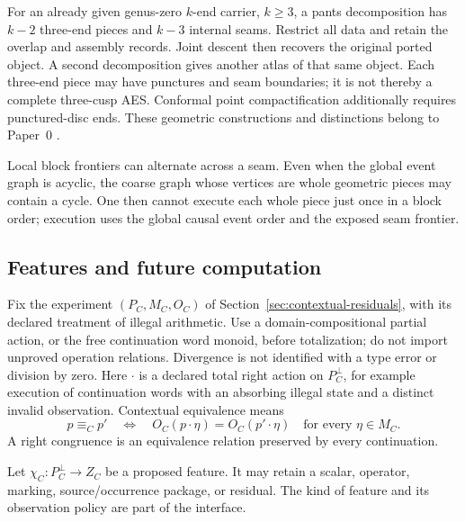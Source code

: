 For an already given genus-zero $k$-end carrier, $k\ge3$, a pants
decomposition has $k-2$ three-end pieces and $k-3$ internal seams.  Restrict
all data and retain the overlap and assembly records.  Joint descent then
recovers the original ported object.  A second decomposition gives another
atlas of that same object.  Each three-end piece may have punctures and seam
boundaries; it is not thereby a complete three-cusp AES.  Conformal point
compactification additionally requires punctured-disc ends.  These geometric
constructions and distinctions belong to Paper~0
\cite{Yuan2026AEGPaperZero}.

Local block frontiers can alternate across a seam.  Even when the global event
graph is acyclic, the coarse graph whose vertices are whole geometric pieces
may contain a cycle.  One then cannot execute each whole piece just once in a
block order; execution uses the global causal event order and the exposed
seam frontier.

\subsection{Features and future computation}

Fix the experiment $(P_C,M_C,O_C)$ of
Section~\ref{sec:contextual-residuals}, with its declared treatment of illegal
arithmetic.  Use a domain-compositional partial action, or the free
continuation word monoid, before totalization; do not import unproved operation
relations.  Divergence is not identified with a type error or division by zero.
Here $\cdot$ is a declared total right action on $P_C^\bot$, for example
execution of continuation words with an absorbing illegal state and a distinct
invalid observation.  Contextual equivalence means
\[
  p\equiv_Cp'
  \quad\Longleftrightarrow\quad
  O_C(p\cdot\eta)=O_C(p'\cdot\eta)
  \quad\text{for every }\eta\in M_C.
\]
A right congruence is an equivalence relation preserved by every continuation.

Let $\chi_C:P_C^\bot\to Z_C$ be a proposed feature.  It may retain a scalar,
operator, marking, source/occurrence package, or residual.  The kind of feature
and its observation policy are part of the interface.

